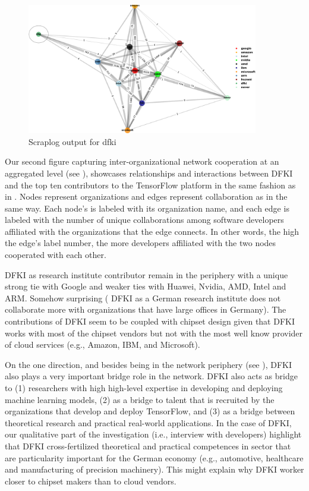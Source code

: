 \documentclass[CHICAGO,Times1COL]{WileyNJDv5} %
\begin{document}
\begin{figure}[h]
\centering
\includegraphics[keepaspectratio=true,width=0.9\textwidth]{./Figures/noo/dfki_cropped.pdf}
\caption{Scraplog output for dfki}
\label{figdfki}
\end{figure}



Our second figure capturing  inter-organizational network cooperation at an aggregated level (see ), showcases relationships and interactions between DFKI and the top ten contributors to the TensorFlow platform  in the same fashion as in .  Nodes represent organizations and edges represent collaboration as in the same way. Each node's is labeled with its organization name, and each edge is labeled with the  number of unique collaborations among software developers affiliated with the organizations that the edge connects. In other words, the high the edge's label number, the more developers affiliated with the two nodes cooperated with each other. 

DFKI as research institute contributor remain in the periphery with a unique strong tie with Google and  weaker ties with Huawei, Nvidia, AMD, Intel and ARM.  Somehow surprising ( DFKI as a German research institute does not collaborate more with organizations that have large offices in Germany). The contributions of DFKI seem to be coupled with chipset design given that DFKI works with most of the chipset vendors but not with the most well know provider of cloud services (e.g., Amazon, IBM, and Microsoft).




On the one direction, and besides being in the network periphery (see  ), DFKI also plays a very important bridge role in the network. DFKI  also acts as bridge to (1) researchers with high high-level expertise in developing and deploying machine learning models,  (2) as a bridge to talent that is recruited by the organizations that develop and deploy TensorFlow, and (3) as a bridge between theoretical research and practical real-world applications. In the case of DFKI, our qualitative part of the investigation (i.e., interview with developers) highlight that DFKI cross-fertilized theoretical and practical competences in sector that are particularity important for the German economy (e.g., automotive, healthcare and manufacturing of precision machinery). This might explain why DFKI worker closer to chipset makers than to cloud vendors. 
\end{document}
